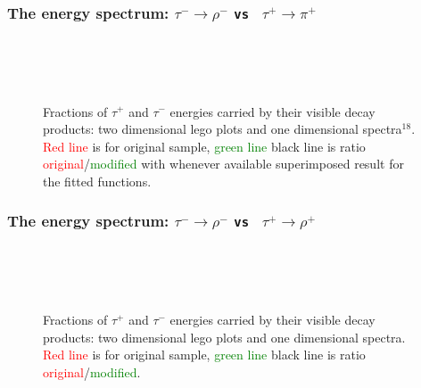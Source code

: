\newpage
\subsubsection{The energy spectrum: $\tau^- \to \rho^-$ {\tt vs } $\tau^+ \to \pi^+$}
\vspace{3\baselineskip}

\begin{figure}[h!]
\centering
{}
 \\
 \\
 \\
\caption{\small Fractions of  $\tau^+$ and $\tau^-$ energies carried by their visible  decay products:
two dimensional lego plots and one dimensional spectra$^{18}$.
\textcolor{red}{Red line} is  for original sample,
\textcolor{green}{green line} \greenlineis
black line is ratio \textcolor{red}{original}/\textcolor{green}{modified} with whenever available superimposed result for the
fitted functions.
}
\end{figure}

\newpage
\subsubsection{The energy spectrum: $\tau^- \to \rho^-$ {\tt vs } $\tau^+ \to \rho^+$}
\vspace{3\baselineskip}

\begin{figure}[h!]
\centering
{}
 \\
 \\
 \\
\caption{\small Fractions of  $\tau^+$ and $\tau^-$ energies carried by their visible  decay products:
two dimensional lego plots and one dimensional spectra.
\textcolor{red}{Red line} is  for original sample,
\textcolor{green}{green line} \greenlineis
black line is ratio \textcolor{red}{original}/\textcolor{green}{modified}.
}\label{Fig:spectra3}
\end{figure}
